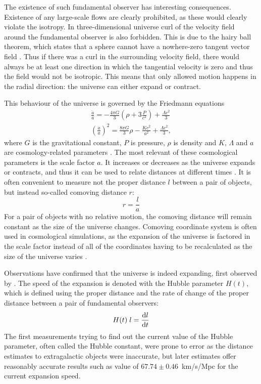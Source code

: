 \documentclass[english, oneside]{HYgradu}
\begin{document}
The existence of such fundamental observer has interesting consequences. Existence of any large-scale flows are clearly prohibited, as these would clearly violate the isotropy. In three-dimensional universe curl of the velocity field around the fundamental observer is also forbidden. This is due to the hairy ball theorem, which states that a sphere cannot have a nowhere-zero tangent vector field \citep{renteln2013manifolds}. Thus if there was a curl in the surrounding velocity field, there would always be at least one direction in which the tangential velocity is zero and thus the field would not be isotropic. This means that only allowed motion happens in the radial direction: the universe can either expand or contract.

This behaviour of the universe is governed by the Friedmann equations
\begin{align}
\frac{\ddot{a}}{a} = -\frac{4\pi G}{3} \left( \rho + 3 \frac{P}{c^2} \right) + \frac{\Lambda c^2}{3} \\
{\left( \frac{\dot{a}}{a} \right)}^2 = \frac{8\pi G}{3}\rho - \frac{Kc^2}{a^2} + \frac{\Lambda c^2}{3},
\end{align}
where $G$ is the gravitational constant, $P$ is pressure, $\rho$ is density and $K$, $\Lambda$ and $a$ are cosmology-related parameters \citep{mo2010galaxy}. The most relevant of these cosmological parameters is the scale factor $a$. It increases or decreases as the universe expands or contracts, and thus it can be used to relate distances at different times \citep{mo2010galaxy}. It is often convenient to measure not the proper distance $l$ between a pair of objects, but instead so-called comoving distance $r$: \citep{mo2010galaxy}
\begin{equation}
r = \frac{l}{a}
\end{equation}
For a pair of objects with no relative motion, the comoving distance will remain constant as the size of the universe changes. Comoving coordinate system is often used in cosmological simulations, as the expansion of the universe is factored in the scale factor instead of all of the coordinates having to be recalculated as the size of the universe varies \citep{griebel1002numerical}.

Observations have confirmed that the universe is indeed expanding, first observed by \citet{hubble1929relation}. The speed of the expansion is denoted with the Hubble parameter $H(t)$, which is defined using the proper distance and the rate of change of the proper distance between a pair of fundamental observers:
\begin{equation}
H(t)\; l = \dv{l}{t}
\end{equation}
The first measurements trying to find out the current value of the Hubble parameter, often called the Hubble constant, were prone to error as the distance estimates to extragalactic objects were inaccurate, but later estimates offer reasonably accurate results such as \citet{planck2016resultsI} value of $67.74 \pm 0.46$~km/s/Mpc for the current expansion speed.
\end{document}
